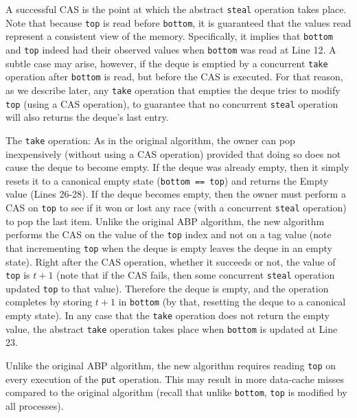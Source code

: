 A successful CAS is the point at which the abstract \lstinline!steal!
operation takes place. Note that because \lstinline!top! is read
before \lstinline!bottom!, it is guaranteed that the values read
represent a consistent view of the memory. Specifically, it implies
that \lstinline!bottom! and \lstinline!top! indeed had their observed
values when \lstinline!bottom! was read at Line 12. A subtle case may
arise, however, if the deque is emptied by a concurrent
\lstinline!take! operation after \lstinline!bottom! is read, but
before the CAS is executed. For that reason, as we describe later, any
\lstinline!take! operation that empties the deque tries to modify
\lstinline!top! (using a CAS operation), to guarantee that no
concurrent \lstinline!steal! operation will also returns the deque's
last entry.

The \lstinline!take! operation: As in the original algorithm, the
owner can pop inexpensively (without using a CAS operation) provided
that doing so does not cause the deque to become empty. If the deque
was already empty, then it simply resets it to a canonical empty state
(\lstinline!bottom == top!) and returns the Empty value (Lines
26-28). If the deque becomes empty, then the owner must perform a CAS
on \lstinline!top! to see if it won or lost any race (with a
concurrent \lstinline!steal! operation) to pop the last item. Unlike
the original ABP algorithm, the new algorithm performs the CAS on the
value of the \lstinline!top! index and not on a tag value (note that
incrementing \lstinline!top! when the deque is empty leaves the deque
in an empty state). Right after the CAS operation, whether it succeeds
or not, the value of \lstinline!top! is $t + 1$ (note that if the CAS
fails, then some concurrent \lstinline!steal! operation updated
\lstinline!top! to that value). Therefore the deque is empty, and the
operation completes by storing $t + 1$ in \lstinline!bottom! (by that,
resetting the deque to a canonical empty state). In any case that the
\lstinline!take! operation does not return the empty value, the
abstract \lstinline!take! operation takes place when
\lstinline!bottom! is updated at Line 23.


Unlike the original ABP algorithm, the new algorithm requires reading
\lstinline!top! on every execution of the \lstinline!put!
operation. This may result in more data-cache misses compared to the
original algorithm (recall that unlike \lstinline!bottom!,
\lstinline!top! is modified by all processes).


